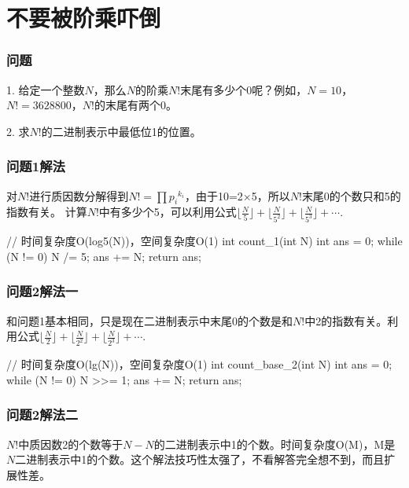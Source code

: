 \section{不要被阶乘吓倒} %
\label{sec:factorial-zeros}

\subsubsection{问题}
1. 给定一个整数$N$，那么$N$的阶乘$N!$末尾有多少个0呢？例如，$N=10$，$N!=3628800$，$N!$的末尾有两个0。

2. 求$N!$的二进制表示中最低位1的位置。

\subsubsection{问题1解法}
对$N!$进行质因数分解得到$N!=\prod {p_i}^{k_i}$，由于10=2×5，所以$N!$末尾0的个数只和5的指数有关。
计算$N!$中有多少个5，可以利用公式$\lfloor\frac{N}{5}\rfloor+\lfloor\frac{N}{5^2}\rfloor+\lfloor\frac{N}{5^3}\rfloor+\cdots$.
\begin{Code}
// 时间复杂度O(log5(N))，空间复杂度O(1)
int count_1(int N) {
    int ans = 0;
	while (N != 0) {
        N /= 5;
        ans += N;
    }
    return ans;
}
\end{Code}

\subsubsection{问题2解法一}
和问题1基本相同，只是现在二进制表示中末尾0的个数是和$N!$中2的指数有关。利用公式$\lfloor\frac{N}{2}\rfloor+\lfloor\frac{N}{2^2}\rfloor+\lfloor\frac{N}{2^3}\rfloor+\cdots$.
\begin{Code}
// 时间复杂度O(lg(N))，空间复杂度O(1)
int count_base_2(int N) {
    int ans = 0;
    while (N != 0) {
        N >>= 1;
        ans += N;
    }
    return ans;
}
\end{Code}

\subsubsection{问题2解法二}
$N!$中质因数2的个数等于$N-N$的二进制表示中1的个数。时间复杂度O(M)，M是$N$二进制表示中1的个数。这个解法技巧性太强了，不看解答完全想不到，而且扩展性差。


